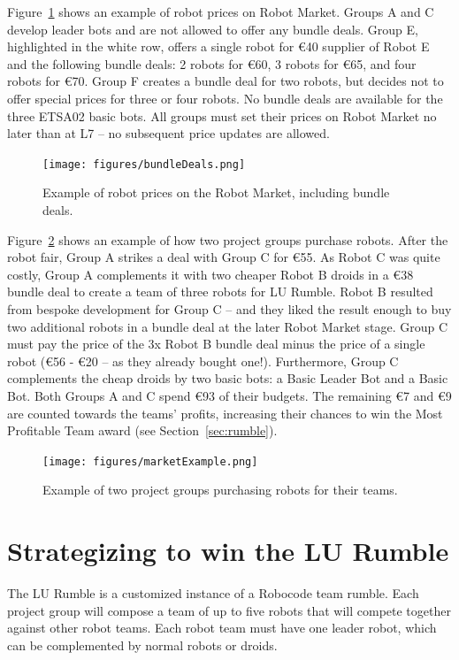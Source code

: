 \documentclass{scrreprt}
\begin{document}
Figure~\ref{fig:bundles} shows an example of robot prices on Robot Market. Groups A and C develop leader bots and are not allowed to offer any bundle deals. Group E, highlighted in the white row, offers a single robot for \euro40 supplier of Robot E and the following bundle deals: 2 robots for \euro60, 3 robots for \euro65, and four robots for \euro70. Group F creates a bundle deal for two robots, but decides not to offer special prices for three or four robots. No bundle deals are available for the three ETSA02 basic bots. All groups must set their prices on Robot Market no later than at L7 -- no subsequent price updates are allowed.

\begin{figure}
\centering
\texttt{[image: figures/bundleDeals.png]}
\caption{Example of robot prices on the Robot Market, including bundle deals.}
\label{fig:bundles}
\end{figure}

Figure~\ref{fig:market} shows an example of how two project groups purchase robots. After the robot fair, Group A strikes a deal with Group C for \euro55. As Robot C was quite costly, Group A complements it with two cheaper Robot B droids in a \euro38 bundle deal to create a team of three robots for LU Rumble. Robot B resulted from bespoke development for Group C -- and they liked the result enough to buy two additional robots in a bundle deal at the later Robot Market stage. Group C must pay the price of the 3x Robot B bundle deal minus the price of a single robot (\euro56 - \euro20 -- as they already bought one!). Furthermore, Group C complements the cheap droids by two basic bots: a Basic Leader Bot and a Basic Bot. Both Groups A and C spend \euro93 of their budgets. The remaining \euro7 and \euro9 are counted towards the teams' profits, increasing their chances to win the Most Profitable Team award (see Section~\ref{sec:rumble}).

\begin{figure}
\centering
\texttt{[image: figures/marketExample.png]}
\caption{Example of two project groups purchasing robots for their teams.}
\label{fig:market}
\end{figure}

\section{Strategizing to win the LU Rumble}
The LU Rumble is a customized instance of a Robocode team rumble. Each project group will compose a team of up to five robots that will compete together against other robot teams. Each robot team must have one leader robot, which can be complemented by normal robots or droids.
\end{document}
